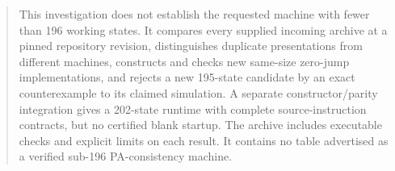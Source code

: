 \begin{abstract}
This investigation does not establish the requested machine with fewer than
196 working states. It compares every supplied incoming archive at a pinned
repository revision, distinguishes duplicate presentations from different
machines, constructs and checks new same-size zero-jump implementations,
and rejects a new 195-state candidate by an exact counterexample to its
claimed simulation. A separate constructor/parity integration gives a
202-state runtime with complete source-instruction contracts, but no
certified blank startup. The archive includes executable checks and explicit
limits on each result. It contains no table advertised as a verified
sub-196 PA-consistency machine.
\end{abstract}
